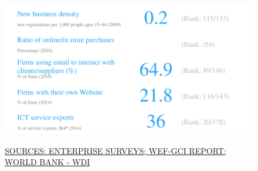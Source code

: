 \documentclass{article}\usepackage[]{graphicx}\usepackage[]{color}
\makeatletter
\def\maxwidth{ %
  \ifdim\Gin@nat@width>\linewidth
    \linewidth
  \else
    \Gin@nat@width
  \fi
}
\makeatother
\begin{document}
\begin{figure}
\begin{minipage}[c]{0.95\textwidth}
\begin{minipage}[b]{0.95\textwidth}
\begin{minipage}[c]{0.48\textwidth}
{\centering \includegraphics[width=\maxwidth]{figure/number_chart_Markets-1} 

}



      \vspace{2ex}
      \hspace{4ex}\scriptsize{\href{http://www.enterprisesurveys.org/data/exploretopics/innovation-and-technology}{\textcolor[HTML]{22A6F5}{SOURCES: ENTERPRISE SURVEYS; }}\href{http://reports.weforum.org/global-competitiveness-index/}{\textcolor[HTML]{22A6F5}{WEF-GCI REPORT; }}\href{http://data.worldbank.org}{\textcolor[HTML]{22A6F5}{WORLD BANK - WDI}}}
    \end{minipage}
  \end{minipage}  
  


\end{minipage}
\end{figure}
\end{document}
